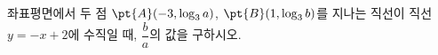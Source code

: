 좌표평면에서 두 점 $\pt{A}(-3{,}\mkern3mu\mathopen{}\log_3 a)$, $\pt{B}(1{,}\mkern3mu\mathopen{}\log_3 b)$를 지나는 직선이 직선 $y=-x+2$에 수직일 때, $\dfrac{b}{a}$의 값을 구하시오.
